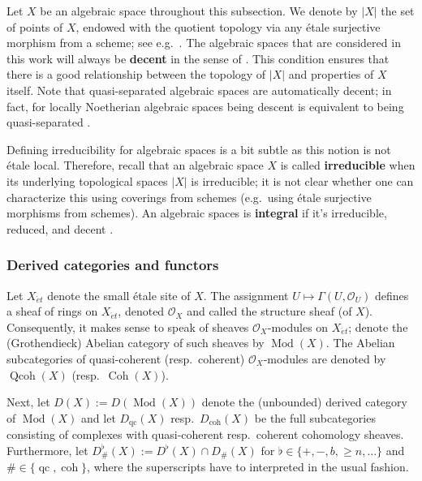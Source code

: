 \documentclass[11pt]{amsart}
\theoremstyle{plain}
\theoremstyle{definition}
\numberwithin{equation}{section}
\numberwithin{theorem}{section}
\begin{document}
Let $X$ be an algebraic space throughout this subsection.
We denote by $|X|$ the set of points of $X$, endowed with the quotient topology via any \'{e}tale surjective morphism from a scheme; see e.g.\ \cite[\href{https://stacks.math.columbia.edu/tag/03BT}{Tag 03BT}]{StacksProject}.
The algebraic spaces that are considered in this work will always be \textbf{decent} in the sense of \cite[\href{https://stacks.math.columbia.edu/tag/03I7}{Tag 03I7}]{StacksProject}.
This condition ensures that there is a good relationship between the topology of $|X|$ and properties of $X$ itself.
Note that quasi-separated algebraic spaces are automatically decent; in fact, for locally Noetherian algebraic spaces being descent is equivalent to being quasi-separated \cite[\href{https://stacks.math.columbia.edu/tag/0BB6}{Tag 0BB6}]{StacksProject}.

Defining irreducibility for algebraic spaces is a bit subtle as this notion is not \'{e}tale local.
Therefore, recall that an algebraic space $X$ is called \textbf{irreducible} when its underlying topological spaces $|X|$ is irreducible; it is not clear whether one can characterize this using coverings from schemes (e.g.\ using \'{e}tale surjective morphisms from schemes).
An algebraic spaces is \textbf{integral} if it's irreducible, reduced, and decent \cite[\href{https://stacks.math.columbia.edu/tag/0AD3}{Tag 0AD3}]{StacksProject}. 

\subsubsection{Derived categories and functors}
\label{sec:prelim_spaces_modules_derived_categories}

Let $X_{\acute{e}t}$ denote the small \'{e}tale site of $X$. 
The assignment $U \mapsto \Gamma (U, \mathcal{O}_ U)$ defines a sheaf of rings on $X_{\acute{e}t}$, denoted $\mathcal{O}_X$ and called the structure sheaf (of $X$). 
Consequently, it makes sense to speak of sheaves $\mathcal{O}_X$-modules on $X_{\acute{e}t}$; denote the (Grothendieck) Abelian category of such sheaves by $\operatorname{Mod}(X)$. 
The Abelian subcategories of quasi-coherent (resp.\ coherent) $\mathcal{O}_X$-modules are denoted by $\operatorname{Qcoh}(X)$ (resp.\ $\operatorname{Coh}(X)$). 

Next, let $D(X):=D(\operatorname{Mod}(X))$ denote the (unbounded) derived category of $\operatorname{Mod}(X)$ and let $D_{\operatorname{qc}}(X)$ resp.\ $D_{\operatorname{coh}}(X)$ be the full subcategories consisting of complexes with quasi-coherent resp.\ coherent cohomology sheaves. 
Furthermore, let $D^{\flat}_{\#}(X):=D^{\flat}(X)\cap D_{\#}(X)$ for $\flat\in \{+,-,b,\geq n,\dots\}$ and $\#\in \{\operatorname{qc},\operatorname{coh}\}$, where the superscripts have to interpreted in the usual fashion. 
\end{document}

